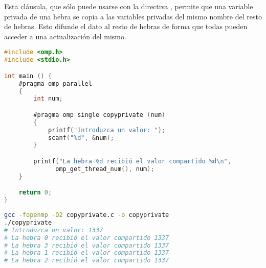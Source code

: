 Esta cláusula, que sólo puede usarse con la directiva , permite que una variable privada de una hebra se copia a las variables privadas del mismo nombre del resto de hebras.
Esto difunde el dato al resto de hebras de forma que todas pueden acceder a una actualización del mismo.

\begin{lstlisting}[language=C]
#include <omp.h>
#include <stdio.h>

int main () {
	#pragma omp parallel
	{
		int num;

		#pragma omp single copyprivate (num)
		{
			printf("Introduzca un valor: ");
			scanf("%d", &num);
		}

		printf("La hebra %d recibió el valor compartido %d\n",
	          omp_get_thread_num(), num);
	}

	return 0;
}
\end{lstlisting}

\begin{lstlisting}[language=sh]
gcc -fopenmp -O2 copyprivate.c -o copyprivate
./copyprivate
# Introduzca un valor: 1337
# La hebra 0 recibió el valor compartido 1337
# La hebra 3 recibió el valor compartido 1337
# La hebra 1 recibió el valor compartido 1337
# La hebra 2 recibió el valor compartido 1337
\end{lstlisting}
